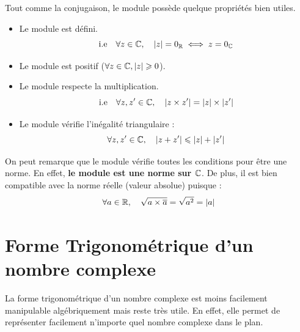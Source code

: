 Tout comme la conjugaison, le module possède quelque propriétés bien utiles. 

\begin{prop}[Module]
    \begin{itemize}
        \item Le module est défini. 
            \[ \text{i.e} \quad \forall z \in \mathbb{C}, \quad | z | = 0_{\mathbb{R}} \iff z = 0_{\mathbb{C}} \] 
        \item Le module est positif ($ \forall z \in \mathbb{C}, |z| \geqslant 0$). 
        \item Le module respecte la multiplication. 
            \[ \text{i.e} \quad \forall z, z' \in \mathbb{C}, \quad | z \times z'| = |z| \times |z'| \] 
        \item Le module vérifie l'inégalité triangulaire :
            \[ \forall z, z' \in \mathbb{C}, \quad | z + z' | \leqslant | z | + |z '| \] 
    \end{itemize}
\end{prop}

\begin{remark}
    On peut remarque que le module vérifie toutes les conditions pour être une norme. 
    En effet, \textbf{le module est une norme sur $\mathbb{C}$}. 
    De plus, il est bien compatible avec la norme réelle (valeur absolue) puisque : 
        \[ \forall a \in \mathbb{R}, \quad \sqrt{a \times \overline{a}} = \sqrt{a^2} = |a| \] 
\end{remark}


\section{Forme Trigonométrique d'un nombre complexe}

La forme trigonométrique d'un nombre complexe est moins facilement manipulable algébriquement mais reste très utile. 
En effet, elle permet de représenter facilement n'importe quel nombre complexe dans le plan. 


